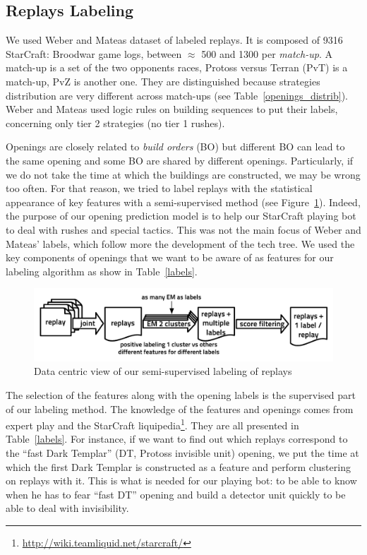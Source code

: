 \subsection{Replays Labeling}
We used Weber and Mateas \citep{weberStrat} dataset of labeled replays. It is composed of 9316 StarCraft: Broodwar game logs, between $\approx$ 500 and 1300 per \textit{match-up}. A match-up is a set of the two opponents races, Protoss versus Terran (PvT) is a match-up, PvZ is another one. They are distinguished because strategies distribution are very different across match-ups (see Table~\ref{openings_distrib}). Weber and Mateas used logic rules on building sequences to put their labels, concerning only tier 2 strategies (no tier 1 rushes).

Openings are closely related to \textit{build orders} (BO) but different BO can lead to the same opening and some BO are shared by different openings. Particularly, if we do not take the time at which the buildings are constructed, we may be wrong too often. For that reason, we tried to label replays with the statistical appearance of key features with a semi-supervised method (see Figure~\ref{replays_labeling}). Indeed, the purpose of our opening prediction model is to help our StarCraft playing bot to deal with rushes and special tactics. This was not the main focus of Weber and Mateas' labels, which follow more the development of the tech tree. We used the key components of openings that we want to be aware of as features for our labeling algorithm as show in Table~\ref{labels}.

\begin{figure}[htp]
\centerline{\includegraphics[width=0.76\columnwidth]{images/replays_labeling.pdf}}
\caption{Data centric view of our semi-supervised labeling of replays}
\label{replays_labeling}
\end{figure}

The selection of the features along with the opening labels is the supervised part of our labeling method. The knowledge of the features and openings comes from expert play and the StarCraft liquipedia\footnote{\url{http://wiki.teamliquid.net/starcraft/}}. They are all presented in Table~\ref{labels}. For instance, if we want to find out which replays correspond to the ``fast Dark Templar'' (DT, Protoss invisible unit) opening, we put the time at which the first Dark Templar is constructed as a feature and perform clustering on replays with it. This is what is needed for our playing bot: to be able to know when he has to fear ``fast DT'' opening and build a detector unit quickly to be able to deal with invisibility.


